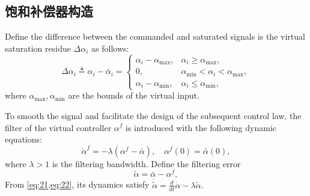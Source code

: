 \documentclass[pdflatex,sn-mathphys-num]{sn-jnl}%
\theoremstyle{thmstyleone}%
\theoremstyle{thmstyletwo}%
\theoremstyle{thmstylethree}%
\begin{document}
\subsection{饱和补偿器构造}
Define the difference between the commanded and saturated signals is the virtual saturation residue $\Delta \alpha_{i}$ as follows:
\begin{equation}\label{eq:21}
	\Delta \alpha_{i}\triangleq \alpha_{i}-\bar{\alpha}_{i}=
	\begin{cases}
	\alpha_{i}-\alpha_{\max}, & \alpha_{i}\ge \alpha_{\max},\\
	0,                        & \alpha_{\min}<\alpha_{i}<\alpha_{\max},\\
	\alpha_{i}-\alpha_{\min}, & \alpha_{i}\le \alpha_{\min},
	\end{cases}
	\end{equation}
where $\alpha_{\max},\alpha_{\min}$ are the bounds of the virtual input.

 To smooth the signal and facilitate the design of the subsequent control law, the filter of the virtual controller $\alpha^{f}$ is introduced with the following dynamic equations:
\begin{equation}\label{eq:22}
	\dot{\alpha}^{f}
	= -\lambda\left(\alpha^{f}-\bar{\alpha}\right),
	\quad
	\alpha^{f}(0)=\bar{\alpha}(0),
\end{equation}
where $\lambda>1$ is the filtering bandwidth. Define the filtering error 
\begin{equation}\label{eq:23}
	\tilde{\alpha}= \bar{\alpha}-\alpha^{f},
\end{equation}
From \cref{eq:21,eq:22}, its dynamics satisfy
\(
\dot{\tilde{\alpha}}= \frac{d}{dt}\dot{\alpha}-\lambda{\tilde{\alpha}}.
\)
\end{document}

